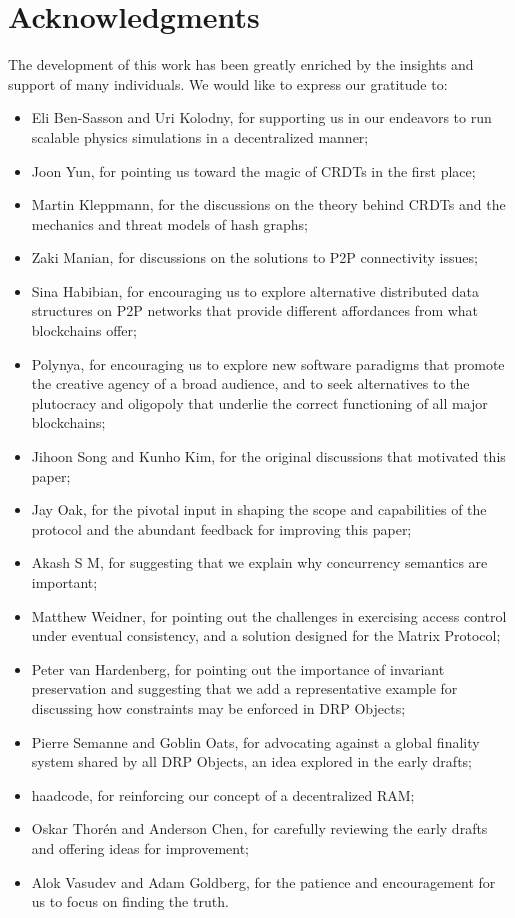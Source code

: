 \documentclass{article}
\begin{document}
\section*{Acknowledgments}

The development of this work has been greatly enriched by the insights and support of many individuals. We would like to express our gratitude to:
\begin{itemize}[leftmargin=0.5cm]
\item Eli Ben-Sasson and Uri Kolodny, for supporting us in our endeavors to run scalable physics simulations in a decentralized manner;
\item Joon Yun, for pointing us toward the magic of CRDTs in the first place;
\item Martin Kleppmann, for the discussions on the theory behind CRDTs and the mechanics and threat models of hash graphs;
\item Zaki Manian, for discussions on the solutions to P2P connectivity issues;
\item Sina Habibian, for encouraging us to explore alternative distributed data structures on P2P networks that provide different affordances from what blockchains offer;
\item Polynya, for encouraging us to explore new software paradigms that promote the creative agency of a broad audience, and to seek alternatives to the plutocracy and oligopoly that underlie the correct functioning of all major blockchains;
\item Jihoon Song and Kunho Kim, for the original discussions that motivated this paper;
\item Jay Oak, for the pivotal input in shaping the scope and capabilities of the protocol and the abundant feedback for improving this paper;
\item Akash S M, for suggesting that we explain why concurrency semantics are important;
\item Matthew Weidner, for pointing out the challenges in exercising access control under eventual consistency, and a solution designed for the Matrix Protocol;
\item Peter van Hardenberg, for pointing out the importance of invariant preservation and suggesting that we add a representative example for discussing how constraints may be enforced in DRP Objects;
\item Pierre Semanne and Goblin Oats, for advocating against a global finality system shared by all DRP Objects, an idea explored in the early drafts;
\item haadcode, for reinforcing our concept of a decentralized RAM;
\item Oskar Thorén and Anderson Chen, for carefully reviewing the early drafts and offering ideas for improvement;
\item Alok Vasudev and Adam Goldberg, for the patience and encouragement for us to focus on finding the truth.
\end{itemize}
\end{document}
